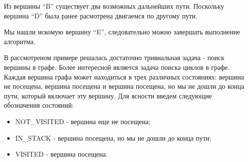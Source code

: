 Из вершины ``B'' существует два возможных дальнейших пути. Поскольку вершина ``D'' была ранее расмотрена двигаемся по другому пути.

\begin{figure}[H]
\end{figure}

\begin{figure}[H]
\end{figure}

Мы нашли искомую вершину ``E'', следовательно можно завершать выполнение алгоритма.

В рассмотреном примере решалась достаточно тривиальная задача - поиск вершины в графе.
Более интересной является задача поиска циклов в графе. Каждая вершина графа может находиться в трех различных состояниях: вершина не посещена, вершина посещена и вершина посещена, но мы не дошли до конца пути, который включает эту вершину. Для ясности введем следующие обозначения состояний:
\begin{itemize}
	\item NOT_VISITED - вершина еще не посещена;
	\item IN_STACK - вершина посещена, но мы не дошли до конца пути;
	\item VISITED - вершина посещена.
\end{itemize}


